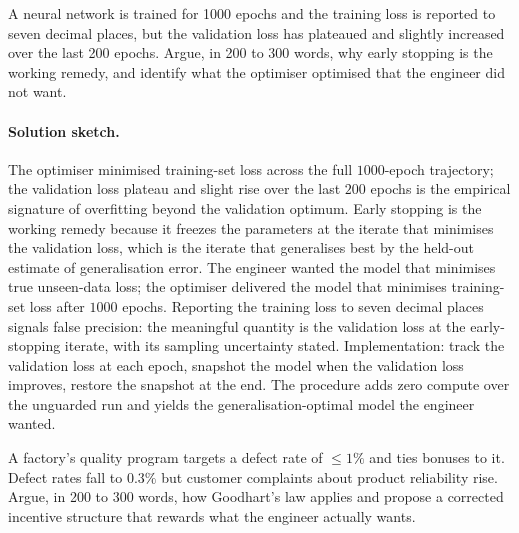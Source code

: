\begin{exercise}
A neural network is trained for 1000 epochs and the training
loss is reported to seven decimal places, but the validation
loss has plateaued and slightly increased over the last 200
epochs. Argue, in 200 to 300 words, why early stopping is the
working remedy, and identify what the optimiser optimised that
the engineer did not want.
\end{exercise}

\paragraph{Solution sketch.}
The optimiser minimised training-set loss across the full
$1000$-epoch trajectory; the validation loss plateau and slight
rise over the last $200$ epochs is the empirical signature of
overfitting beyond the validation optimum. Early stopping is the
working remedy because it freezes the parameters at the iterate
that minimises the validation loss, which is the iterate that
generalises best by the held-out estimate of generalisation error.
The engineer wanted the model that minimises true unseen-data
loss; the optimiser delivered the model that minimises training-set
loss after $1000$ epochs. Reporting the training loss to seven
decimal places signals false precision: the meaningful quantity
is the validation loss at the early-stopping iterate, with its
sampling uncertainty stated. Implementation: track the validation
loss at each epoch, snapshot the model when the validation loss
improves, restore the snapshot at the end. The procedure adds
zero compute over the unguarded run and yields the
generalisation-optimal model the engineer wanted.

\begin{exercise}
A factory's quality program targets a defect rate of $\leq 1\%$
and ties bonuses to it. Defect rates fall to $0.3\%$ but customer
complaints about product reliability rise. Argue, in 200 to 300
words, how Goodhart's law applies and propose a corrected
incentive structure that rewards what the engineer actually wants.
\end{exercise}

